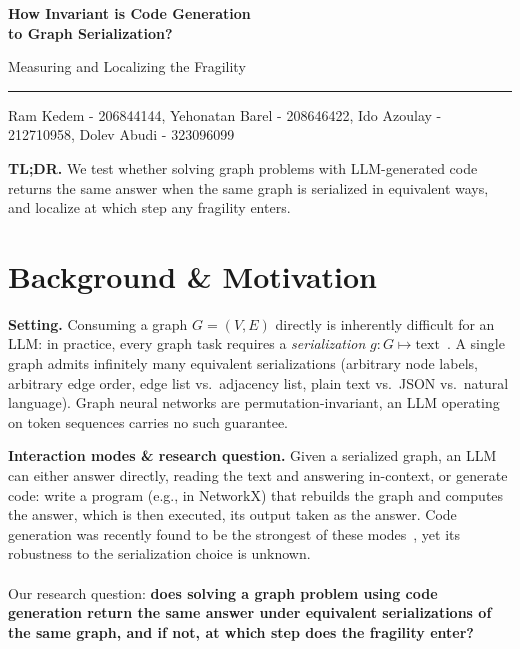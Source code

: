\documentclass[10pt,a4paper]{article}
\newcommand{\head}[1]{\vspace{0.35em}\noindent\textbf{#1}\hspace{0.5em}}
\begin{document}
{\raggedright
{\huge\bfseries How Invariant is Code Generation\\[2pt] to Graph Serialization?\par}
\vspace{4pt}
{\Large Measuring and Localizing the Fragility\par}
\vspace{8pt}
\rule{\linewidth}{0.4pt}\par
\vspace{4pt}
{\small
Ram Kedem - 206844144, Yehonatan Barel - 208646422, Ido Azoulay - 212710958, Dolev Abudi - 323096099\par}
}
\vspace{10pt}

\noindent\begin{minipage}{\linewidth}
\colorbox{accentlight}{\begin{minipage}{\dimexpr\linewidth-16pt}
\vspace{5pt}\hspace{6pt}\begin{minipage}{\dimexpr\linewidth-14pt}
\textbf{\color{accent}TL;DR.} We test whether solving graph problems with LLM-generated code returns the same answer when the same graph is serialized in equivalent ways, and localize at which step any fragility enters.
\end{minipage}\vspace{5pt}
\end{minipage}}
\end{minipage}

\section{Background \& Motivation}

\head{Setting.} Consuming a graph $G=(V,E)$ directly is inherently difficult for an LLM: in practice, every graph task requires a \emph{serialization} $g:G\mapsto\text{text}$~\cite{fatemi}. A single graph admits infinitely many equivalent serializations (arbitrary node labels, arbitrary edge order, edge list vs.\ adjacency list, plain text vs.\ JSON vs.\ natural language). Graph neural networks are permutation-invariant, an LLM operating on token sequences carries no such guarantee.

\head{Interaction modes \& research question.} Given a serialized graph, an LLM can either answer directly, reading the text and answering in-context, or generate code: write a program (e.g., in NetworkX) that rebuilds the graph and computes the answer, which is then executed, its output taken as the answer. Code generation was recently found to be the strongest of these modes~\cite{finkelshtein}, yet its robustness to the serialization choice is unknown.\\\\ Our research question: \textbf{does solving a graph problem using code generation return the same answer under equivalent serializations of the same graph, and if not, at which step does the fragility enter?}
\end{document}
